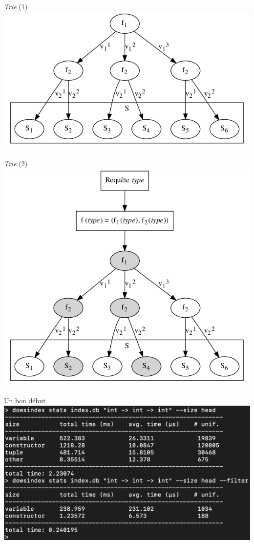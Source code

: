\documentclass[serif]{beamer}
\newcommand{\?}{\stackrel{?}{=}}
\begin{document}
\begin{frame}{\textit {Trie} (1)}
	\includegraphics[scale=0.5,center]{graphs/trie1}
\end{frame}


\begin{frame}{\textit {Trie} (2)}
	\includegraphics[scale=0.4,center]{graphs/trie2}
\end{frame}


\begin{frame}{Un bon début}
	\includegraphics[scale=0.3,center]{images/stats4}
\end{frame}
\end{document}
